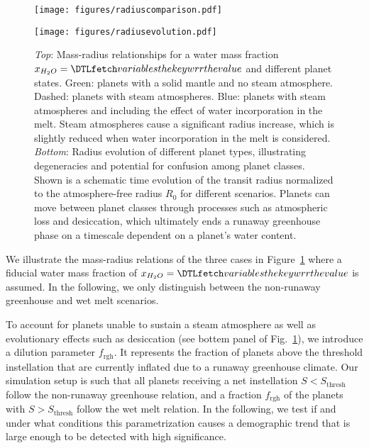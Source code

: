 \documentclass[twocolumn,twocolappendix]{aastex631}
\begin{document}
\begin{figure}
    \begin{centering}
        \texttt{[image: figures/radiuscomparison.pdf]}
    \end{centering}
    \begin{centering}
        \texttt{[image: figures/radiusevolution.pdf]}
        \caption{
            \textit{Top}: Mass-radius relationships for a water mass fraction $x_{H_2O}= \var{wrr}$ and different planet states. Green: planets with a solid mantle and no steam atmosphere. Dashed: planets with steam atmospheres. Blue: planets with steam atmospheres and including the effect of water incorporation in the melt.
                Steam atmospheres cause a significant radius increase, which is slightly reduced when water incorporation in the melt is considered.
            \textit{Bottom}: Radius evolution of different planet types, illustrating degeneracies and potential for confusion among planet classes. Shown is a schematic time evolution of the transit radius normalized to the atmosphere-free radius $R_\mathrm{0}$ for different scenarios. Planets can move between planet classes through processes such as atmospheric loss and desiccation, which ultimately ends a runaway greenhouse phase on a timescale dependent on a planet's water content.}
        \label{fig:radiusevolution}
    \end{centering}
\end{figure}
We illustrate the mass-radius relations of the three cases in Figure~\ref{fig:radiusevolution} where a fiducial water mass fraction of $x_{H_2O}= \var{wrr}$ is assumed.
In the following, we only distinguish between the non-runaway greenhouse and wet melt scenarios.

To account for planets unable to sustain a steam atmosphere as well as evolutionary effects such as desiccation (see bottem panel of Fig.~\ref{fig:radiusevolution}), we introduce a dilution parameter $f_\mathrm{rgh}$.
It represents the fraction of planets above the threshold instellation that are currently inflated due to a runaway greenhouse climate.
Our simulation setup is such that all planets receiving a net instellation $S < S_\mathrm{thresh}$ follow the non-runaway greenhouse relation, and a fraction $f_\mathrm{rgh}$ of the planets with $S > S_\mathrm{thresh}$ follow the wet melt relation.
In the following, we test if and under what conditions this parametrization causes a demographic trend that is large enough to be detected with high significance.
\end{document}
